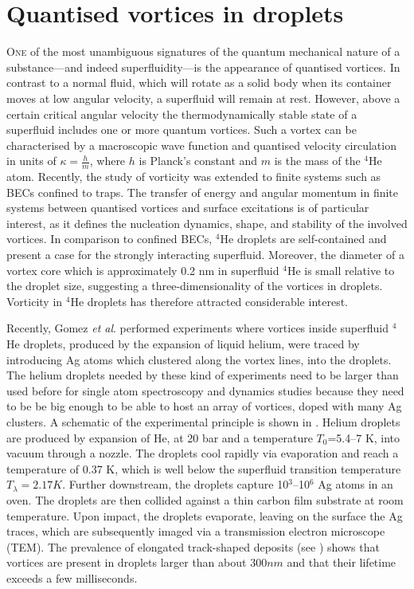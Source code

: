 \chapter{Quantised vortices in droplets}\label{sec:quant-vort}
	\lettrine[lines=4]{\color{activeColor}O}{ne} of the most unambiguous signatures of the quantum mechanical nature of a substance---and indeed superfluidity---is the appearance of quantised vortices. In contrast to a normal fluid, which will rotate as a solid body when its container moves at low angular velocity, a superfluid will remain at rest. However, above a certain critical angular velocity the thermodynamically stable state of a superfluid includes one or more quantum vortices. Such a vortex can be characterised by a macroscopic wave function and quantised velocity circulation in units of $\kappa=\frac{h}{m}$, where $h$ is Planck’s constant and $m$ is the mass of the $^4$He atom\citep{Don91,Pit03}. Recently, the study of vorticity was extended to finite systems such as BECs confined to traps\citep{Pit03,Fetter2009}. The transfer of energy and angular momentum in finite systems between quantised vortices and surface excitations is of particular interest, as it defines the nucleation dynamics, shape, and stability of the involved vortices\citep{Pit03,Fetter2009}. In comparison to confined BECs, $^4$He droplets are self-contained and present a case for the strongly interacting superfluid. Moreover, the diameter of a vortex core which is approximately 0.2 nm in superfluid $^4$He\citep{Don91} is small relative to the droplet size, suggesting a three-dimensionality of the vortices in droplets. Vorticity in $^4$He droplets has therefore attracted considerable interest\citep{Clo98,Lehmann2003,Bar06,Sti06}.
	
	Recently, Gomez \emph{et al}. performed experiments\citep{Gom12} where vortices inside superfluid $^4$He droplets, produced by the expansion of liquid helium, were traced by introducing Ag atoms which clustered along the vortex lines, into the droplets. The helium droplets needed by these kind of experiments need to be larger than used before for single atom spectroscopy and dynamics studies because they need to be be big enough to be able to host an array of vortices, doped with many Ag clusters. A schematic of the experimental principle is shown in . Helium droplets are produced by expansion of He, at 20 bar and a temperature $T_0$=5.4--7 K, into vacuum through a nozzle. The droplets cool rapidly via evaporation and reach a temperature of 0.37 K\citep{Hartmann1995}, which is well below the superfluid transition temperature $T_\lambda=2.17\unit{K}$\citep{Don91,Pit03}. Further downstream, the droplets capture 10$^3$–10$^6$ Ag atoms in an oven\citep{Log11d}. The droplets are then collided against a thin carbon film substrate at room temperature\citep{Log11d}. Upon impact, the droplets evaporate, leaving on the surface the Ag traces, which are subsequently imaged via a transmission electron microscope (TEM). The prevalence of elongated track-shaped deposits (see ) shows that vortices are present in droplets larger than about $300\unit{nm}$ and that their lifetime exceeds a few milliseconds.
	
